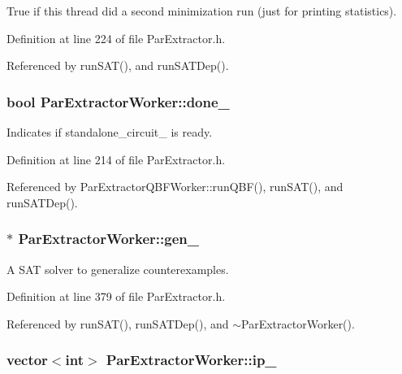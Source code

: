 True if this thread did a second minimization run (just for printing statistics). 



Definition at line 224 of file Par\-Extractor.\-h.



Referenced by run\-S\-A\-T(), and run\-S\-A\-T\-Dep().

\hypertarget{classParExtractorWorker_a460487c299f8c86e745a940278d38ee0}{
\subsubsection[{done\-\_\-}]{\setlength{\rightskip}{0pt plus 5cm}bool Par\-Extractor\-Worker\-::done\-\_\-}}\label{classParExtractorWorker_a460487c299f8c86e745a940278d38ee0}


Indicates if standalone\-\_\-circuit\-\_\- is ready. 



Definition at line 214 of file Par\-Extractor.\-h.



Referenced by Par\-Extractor\-Q\-B\-F\-Worker\-::run\-Q\-B\-F(), run\-S\-A\-T(), and run\-S\-A\-T\-Dep().

\hypertarget{classParExtractorWorker_aa60776c90a94164e2cfbfd81f77ccb21}{
\subsubsection[{gen\-\_\-}]{$\ast$ Par\-Extractor\-Worker\-::gen\-\_\-\hspace{0.3cm}{\ttfamily [protected]}}}\label{classParExtractorWorker_aa60776c90a94164e2cfbfd81f77ccb21}


A S\-A\-T solver to generalize counterexamples. 



Definition at line 379 of file Par\-Extractor.\-h.



Referenced by run\-S\-A\-T(), run\-S\-A\-T\-Dep(), and $\sim$\-Par\-Extractor\-Worker().

\hypertarget{classParExtractorWorker_ab1385a3c5d2f203f6a1dbaf1ed6b5fcd}{
\subsubsection[{ip\-\_\-}]{\setlength{\rightskip}{0pt plus 5cm}vector$<$int$>$ Par\-Extractor\-Worker\-::ip\-\_\-\hspace{0.3cm}{\ttfamily [protected]}}}\label{classParExtractorWorker_ab1385a3c5d2f203f6a1dbaf1ed6b5fcd}


